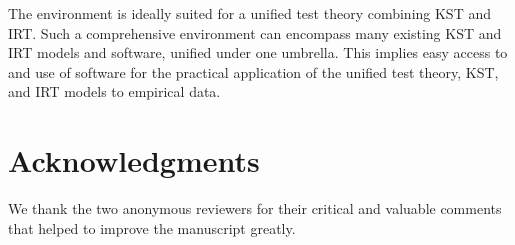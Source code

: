 \documentclass[nojss]{jss}
\begin{document}
The  environment 
is ideally suited for a unified test theory combining KST and IRT.
Such a comprehensive environment can encompass many existing KST and IRT 
models and software, unified under one umbrella.
This implies easy access to and use of software for the
practical application of the unified test theory, KST, and
IRT models to empirical data.

\section*{Acknowledgments}

We thank the two anonymous reviewers for their critical and valuable comments 
that helped to improve the manuscript greatly.


\end{document}
